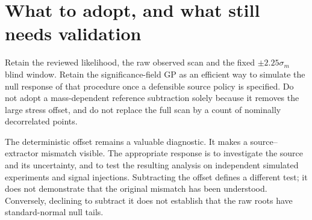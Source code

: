 \section{What to adopt, and what still needs validation}
Retain the reviewed likelihood, the raw observed scan and the fixed $\pm2.25\sigma_m$ blind window. Retain the significance-field GP as an efficient way to simulate the null response of that procedure once a defensible source policy is specified. Do not adopt a mass-dependent reference subtraction solely because it removes the large stress offset, and do not replace the full scan by a count of nominally decorrelated points.

The deterministic offset remains a valuable diagnostic. It makes a source--extractor mismatch visible. The appropriate response is to investigate the source and its uncertainty, and to test the resulting analysis on independent simulated experiments and signal injections. Subtracting the offset defines a different test; it does not demonstrate that the original mismatch has been understood. Conversely, declining to subtract it does not establish that the raw roots have standard-normal null tails.


